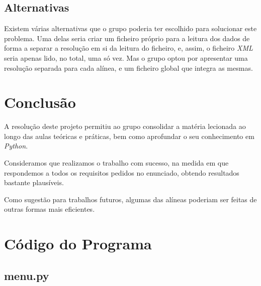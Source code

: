 \documentclass[11pt,a4paper]{report}
\begin{document}
\section{Alternativas}

\qquad Existem várias alternativas que o grupo poderia ter escolhido para solucionar este problema. Uma delas seria criar um ficheiro próprio para a leitura dos dados de forma a separar a resolução em si da leitura do ficheiro, e, assim, o ficheiro \textit{XML} seria apenas lido, no total, uma só vez. Mas o grupo optou por apresentar uma resolução separada para cada alínea, e um ficheiro global que integra as mesmas.

\chapter{Conclusão} \label{concl}

\qquad A resolução deste projeto permitiu ao grupo consolidar a matéria lecionada ao longo das aulas teóricas e práticas, bem como aprofundar o seu conhecimento em \textit{Python}.\par
\qquad Consideramos que realizamos o trabalho com sucesso, na medida em que respondemos a todos os requisitos pedidos no enunciado, obtendo resultados bastante plausíveis.\par
\qquad Como sugestão para trabalhos futuros, algumas das alíneas poderiam ser feitas de outras formas mais eficientes. 


\appendix %
\chapter{Código do Programa}

\section*{menu.py}
\end{document}
